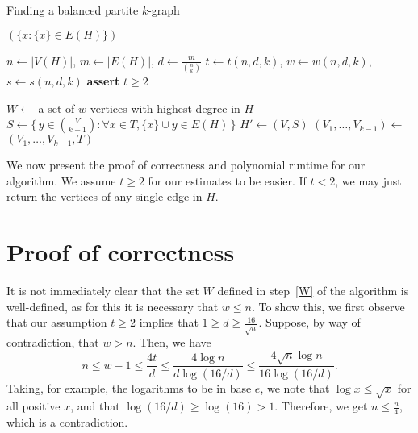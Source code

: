 \begin{algorithm}[H]
    \caption{Finding a balanced partite $k$-graph}
    \label{alg:kpartite}
    \begin{algorithmic}[1]
                \State \Return $(\{x \colon \{x\} \in E(H)\})$
            \EndIf

            \State $n \gets |V(H)|$, $m \gets |E(H)|$, $d \gets \frac{m}{\binom{n}{k}}$
            \State $t \gets t(n, d, k)$, $w \gets w(n, d, k)$, $s \gets s(n, d, k)$
            \State \textbf{assert} $t \ge 2$

            \State $W \gets$ a set of $w$ vertices with highest degree in $H$
                \State $S \gets \{\,y \in \binom{V}{k-1} \colon \forall x \in T, \{x\} \cup y \in E(H)\,\}$
                    \State $H' \gets (V, S)$  
                    \State $(V_1, \dots, V_{k-1}) \gets$  \label{recurse}
                    \State \Return $(V_1, \dots, V_{k-1}, T)$
                \EndIf
            \EndFor
        \EndFunction
    \end{algorithmic}
\end{algorithm}

We now present the proof of correctness and polynomial runtime for our algorithm.
We assume $t \ge 2$ for our estimates to be easier.
If $t < 2$, we may just return the vertices of any single edge in $H$.

\section{Proof of correctness}\label{sec:correctness}

It is not immediately clear that the set $W$ defined in step~\ref{W} of the algorithm
is well-defined, as for this it is necessary that $w \leq n$.
To show this, we first observe that our assumption $t \geq 2$
implies that $ 1 \geq d \geq \frac{16}{\sqrt {n}}$.
Suppose, by way of contradiction, that $w > n$.
Then, we have
\[
    n \leq w - 1 \leq \frac{4t}{d} \leq \frac{4\log n}{d\log(16/d)} \leq \frac{4 \sqrt {n} \log n }{16 \log(16/d)}.
\]
Taking, for example, the logarithms to be in base $e$, we note that $\log x \leq \sqrt {x}$ for all positive $x$,
and that $\log(16/d) \geq \log(16) > 1$.
Therefore, we get $n \leq \frac{n}{4}$, which is a contradiction.

